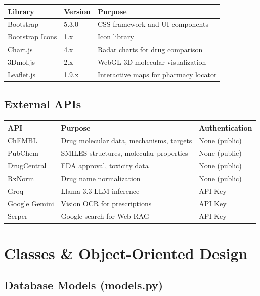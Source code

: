 \documentclass[12pt,a4paper]{report}
\begin{document}
\begin{longtable}{|l|l|X|}
\hline
\textbf{Library} & \textbf{Version} & \textbf{Purpose} \\
\hline
\endhead
Bootstrap & 5.3.0 & CSS framework and UI components \\
\hline
Bootstrap Icons & 1.x & Icon library \\
\hline
Chart.js & 4.x & Radar charts for drug comparison \\
\hline
3Dmol.js & 2.x & WebGL 3D molecular visualization \\
\hline
Leaflet.js & 1.9.x & Interactive maps for pharmacy locator \\
\hline
\end{longtable}

\section{External APIs}

\begin{longtable}{|l|X|l|}
\hline
\textbf{API} & \textbf{Purpose} & \textbf{Authentication} \\
\hline
\endhead
ChEMBL & Drug molecular data, mechanisms, targets & None (public) \\
\hline
PubChem & SMILES structures, molecular properties & None (public) \\
\hline
DrugCentral & FDA approval, toxicity data & None (public) \\
\hline
RxNorm & Drug name normalization & None (public) \\
\hline
Groq & Llama 3.3 LLM inference & API Key \\
\hline
Google Gemini & Vision OCR for prescriptions & API Key \\
\hline
Serper & Google search for Web RAG & API Key \\
\hline
\end{longtable}

\newpage

\chapter{Classes \& Object-Oriented Design}

\section{Database Models (models.py)}
\end{document}
